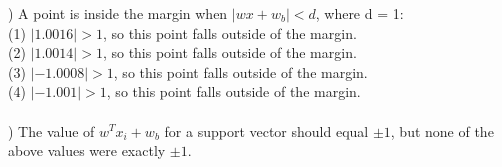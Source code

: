 \documentclass[12pt]{article}
\begin{document}
) A point is inside the margin when $|wx+w_b| < d$, where d = 1:\\
\indent (1) $|1.0016| > 1$, so this point falls outside of the margin.\\
\indent (2) $|1.0014| > 1$, so this point falls outside of the margin.\\
\indent (3) $|-1.0008| > 1$, so this point falls outside of the margin.\\
\indent (4) $|-1.001| > 1$, so this point falls outside of the margin.\\



\noindent \hrulefill \\



) The value of $w^Tx_i+w_b$ for a support vector should equal $\pm1$, but none of the above values were exactly $\pm1$.
\end{document}
